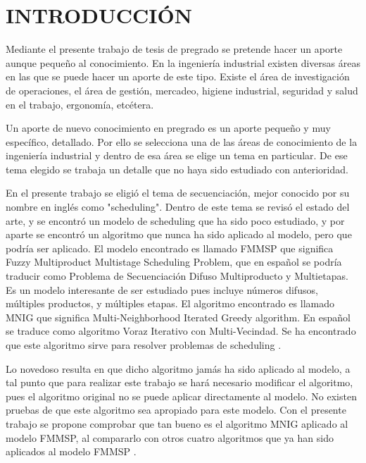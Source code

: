 \documentclass{article}
\begin{document}
\section{INTRODUCCIÓN}

Mediante el presente trabajo de tesis de pregrado se pretende hacer un aporte
aunque pequeño al conocimiento. En la ingeniería industrial existen diversas
áreas en las que se puede hacer un aporte de este tipo. Existe el área de
investigación de operaciones, el área de gestión, mercadeo, higiene industrial,
seguridad y salud en el trabajo, ergonomía, etcétera. 

\vspace{\baselineskip}
Un aporte de nuevo conocimiento en pregrado es un aporte pequeño y muy
específico, detallado. Por ello se selecciona una de las áreas de conocimiento
de la ingeniería industrial y dentro de esa área se elige un tema en particular.
De ese tema elegido se trabaja un detalle que no haya sido estudiado con
anterioridad. 

\pagebreak

\vspace{\baselineskip}
En el presente trabajo se eligió el tema de secuenciación, mejor conocido por
su nombre en inglés como "scheduling". Dentro de este tema se revisó el estado
del arte, y se encontró un modelo de scheduling que ha sido poco estudiado, y
por aparte se encontró un algoritmo que nunca ha sido aplicado al modelo, pero
que podría ser aplicado. El modelo encontrado \autocite{modFMMSP} es llamado 
FMMSP que significa Fuzzy Multiproduct Multistage Scheduling Problem, que en 
español se podría traducir como Problema de Secuenciación Difuso Multiproducto 
y Multietapas. Es un modelo interesante de ser estudiado pues incluye números 
difusos, múltiples productos, y múltiples etapas. El algoritmo encontrado 
\autocite{algMNIG} es llamado MNIG que significa Multi-Neighborhood Iterated
Greedy algorithm. En español se traduce como algoritmo Voraz Iterativo con 
Multi-Vecindad. Se ha encontrado que este algoritmo sirve para resolver 
problemas de scheduling \autocite{algMNIG}. 

\vspace{\baselineskip}
Lo novedoso resulta en que dicho algoritmo jamás ha sido aplicado al modelo, a 
tal punto que para realizar este trabajo se hará necesario modificar el 
algoritmo, pues el algoritmo original no se puede aplicar directamente al 
modelo. No existen pruebas de que este algoritmo sea apropiado para este modelo.
Con el presente trabajo se propone comprobar que tan bueno es el algoritmo MNIG
aplicado al modelo FMMSP, al compararlo con otros cuatro algoritmos que ya han
sido aplicados al modelo FMMSP \autocite{modFMMSP}.
\end{document}

